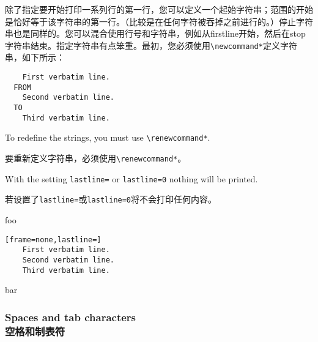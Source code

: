 \documentclass[twoside]{article}
\newcommand\cs[1]{\texttt{\textbackslash#1}}
\begin{document}
除了指定要开始打印一系列行的第一行，您可以定义一个起始字符串；范围的开始是恰好等于该字符串的第一行。（比较是在任何字符被吞掉之前进行的。）停止字符串也是同样的。您可以混合使用行号和字符串，例如从firstline开始，然后在stop字符串结束。指定字符串有点笨重。最初，您必须使用\cs{newcommand*}定义字符串，如下所示：


\begin{SideBySideExample}[gobble=2]
  \newcommand*\FancyVerbStartString{FROM}
  \newcommand*\FancyVerbStopString{TO}
  \begin{Verbatim}
    First verbatim line.
  FROM
    Second verbatim line.
  TO
    Third verbatim line.
  \end{Verbatim}
\end{SideBySideExample}

\noindent To redefine the strings, you must use \cs{renewcommand*}.

\noindent 要重新定义字符串，必须使用\cs{renewcommand*}。

With the setting \texttt{lastline=} or \texttt{lastline=0} nothing will be printed.

若设置了\texttt{lastline=}或\texttt{lastline=0}将不会打印任何内容。

\begin{SideBySideExample}[gobble=2]
  foo
  \begin{Verbatim}[frame=none,lastline=]
    First verbatim line.
    Second verbatim line.
    Third verbatim line.
  \end{Verbatim}
  bar
\end{SideBySideExample}

\subsubsection{Spaces and tab characters\\空格和制表符}
\end{document}
